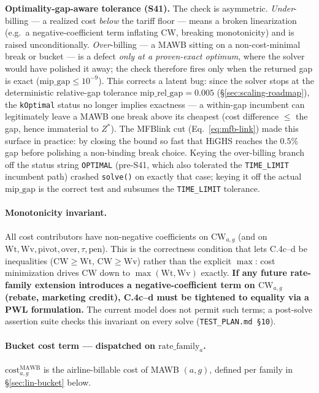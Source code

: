 \documentclass[11pt,a4paper]{article}
\theoremstyle{definition}
\begin{document}
\textbf{Optimality-gap-aware tolerance (S41).} The check is asymmetric.
\emph{Under}-billing --- a realized cost \emph{below} the tariff floor --- means a broken
linearization (e.g.\ a negative-coefficient term inflating $\text{CW}$, breaking monotonicity)
and is raised unconditionally. \emph{Over}-billing --- a MAWB sitting on a non-cost-minimal
break or bucket --- is a defect \emph{only at a proven-exact optimum}, where the solver would
have polished it away; the check therefore fires only when the returned gap is exact
($\text{mip\_gap} \leq 10^{-9}$). This corrects a latent bug: since the solver stops at the
deterministic relative-gap tolerance $\text{mip\_rel\_gap} = 0.005$ (\S\ref{sec:scaling-roadmap}),
the \texttt{kOptimal} status no longer implies exactness --- a within-gap incumbent can
legitimately leave a MAWB one break above its cheapest (cost difference $\leq$ the gap, hence
immaterial to $Z^*$). The MFBlink cut (Eq.~\ref{eq:mfb-link}) made this surface in practice: by
closing the bound so fast that HiGHS reaches the $0.5\%$ gap before polishing a non-binding
break choice. Keying the over-billing branch off the status string \texttt{OPTIMAL} (pre-S41,
which also tolerated the \texttt{TIME\_LIMIT} incumbent path) crashed \texttt{solve()} on exactly
that case; keying it off the actual $\text{mip\_gap}$ is the correct test and subsumes the
\texttt{TIME\_LIMIT} tolerance.

\paragraph{Monotonicity invariant.}
All cost contributors have non-negative coefficients on $\text{CW}_{a,g}$
(and on $\text{Wt}, \text{Wv}, \text{pivot}, \text{over}, \tau, \text{pen}$).
This is the
correctness condition that lets C.4c--d be inequalities ($\text{CW} \geq
\text{Wt},\, \text{CW} \geq \text{Wv}$) rather than the explicit $\max$: cost
minimization drives $\text{CW}$ down to $\max(\text{Wt}, \text{Wv})$ exactly.
\textbf{If any future rate-family extension introduces a negative-coefficient
term on $\text{CW}_{a,g}$ (rebate, marketing credit), C.4c--d must be
tightened to equality via a PWL formulation.} The current model does not
permit such terms; a post-solve assertion suite checks this invariant on
every solve (\texttt{TEST\_PLAN.md \S10}).

\paragraph{Bucket cost term --- dispatched on $\text{rate\_family}_a$.}
$\text{cost}^{\text{MAWB}}_{a,g}$ is the airline-billable cost of MAWB
$(a, g)$, defined per family in \S\ref{sec:lin-bucket} below.
\end{document}
